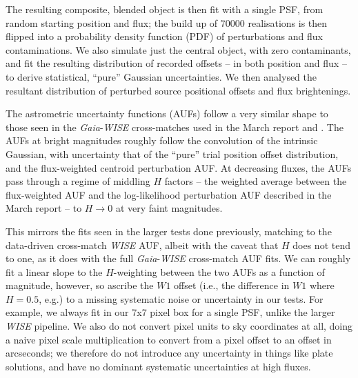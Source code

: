 \documentclass[fleqn,usenatbib]{mnras}
\begin{document}
The resulting composite, blended object is then fit with a single PSF, from random starting position and flux; the build up of 70000 realisations is then flipped into a probability density function (PDF) of perturbations and flux contaminations.
We also simulate just the central object, with zero contaminants, and fit the resulting distribution of recorded offsets -- in both position and flux -- to derive statistical, ``pure'' Gaussian uncertainties.
We then analysed the resultant distribution of perturbed source positional offsets and flux brightenings.

The astrometric uncertainty functions (AUFs) follow a very similar shape to those seen in the \textit{Gaia}-\textit{WISE} cross-matches used in the March report and \citet{2018MNRAS.481.2148W}.
The AUFs at bright magnitudes roughly follow the convolution of the intrinsic Gaussian, with uncertainty that of the ``pure'' trial position offset distribution, and the flux-weighted centroid perturbation AUF.
At decreasing fluxes, the AUFs pass through a regime of middling $H$ factors -- the weighted average between the flux-weighted AUF and the log-likelihood perturbation AUF described in the March report -- to $H\to0$ at very faint magnitudes.

This mirrors the fits seen in the larger tests done previously, matching to the data-driven cross-match \textit{WISE} AUF, albeit with the caveat that $H$ does not tend to one, as it does with the full \textit{Gaia}-\textit{WISE} cross-match AUF fits.
We can roughly fit a linear slope to the $H$-weighting between the two AUFs as a function of magnitude, however, so ascribe the $W1$ offset (i.e., the difference in $W1$ where $H=0.5$, e.g.) to a missing systematic noise or uncertainty in our tests.
For example, we always fit in our 7x7 pixel box for a single PSF, unlike the larger \textit{WISE} pipeline.
We also do not convert pixel units to sky coordinates at all, doing a naive pixel scale multiplication to convert from a pixel offset to an offset in arcseconds; we therefore do not introduce any uncertainty in things like plate solutions, and have no dominant systematic uncertainties at high fluxes.

\end{document}
